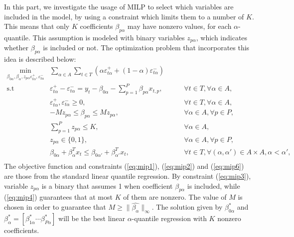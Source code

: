 In this part, we investigate the usage of MILP to select which variables are included in the model, by using a constraint which limits them to a number of $K$. This means that only $K$ coefficients $\beta_{p\alpha}$ may have nonzero values, for each $\alpha$-quantile. 
This assumption is modeled with binary variables $z_{p\alpha}$, which indicates whether $\beta_{p\alpha}$ is included or not.
The optimization problem that incorporates this idea is described below:
\begin{eqnarray}
 \underset{\beta_{0\alpha},\beta_\alpha,z_{p \alpha} \varepsilon_{t \alpha}^{+},\varepsilon_{t \alpha}^{-}}{\text{min}} & \sum_{\alpha \in A} \sum_{t\in T}\left(\alpha\varepsilon_{t \alpha}^{+}+(1-\alpha)\varepsilon_{t\alpha}^{-}\right) \label{eq:mip0} \\
\mbox{s.t } & \varepsilon_{t \alpha}^{+}-\varepsilon_{t \alpha}^{-}=y_{t}-\beta_{0 \alpha}-\sum_{p=1}^{P}\beta_{p \alpha}x_{t,p},& \qquad\forall t \in T ,\forall \alpha \in A, \label{eq:mip1}\\
& \varepsilon_{t \alpha}^{+},\varepsilon_{t \alpha}^{-}\geq0,&\qquad\forall t \in T ,\forall \alpha \in A, \label{eq:mip2}\\
& - M z_{p \alpha} \leq \beta_{p \alpha} \leq M z_{p \alpha},&\qquad \forall \alpha \in A, \forall p\in P, \label{eq:mip3}\\
& \sum_{p=1}^P z_{p \alpha} \leq K, & \qquad \forall \alpha \in A, \label{eq:mip4}\\
& z_{p \alpha} \in \{0,1\},&\qquad \forall \alpha \in A, \forall p\in P, \label{eq:mip5}\\
& \beta_{0\alpha} + \beta_{\alpha}^T x_{t} \leq \beta_{0\alpha'} + \beta_{\alpha'}^T x_{t}, & \qquad \forall t \in T, \forall (\alpha, \alpha') \in A \times A,  \alpha < \alpha',\nonumber\\ \label{eq:mip6}
\end{eqnarray}
The objective function and constraints (\ref{eq:mip1}), (\ref{eq:mip2}) and (\ref{eq:mip6}) are those from the standard linear quantile regression. 
By constraint (\ref{eq:mip3}), variable $z_{p \alpha}$ is a binary that assumes 1 when coefficient $\beta_{p \alpha}$ is included, while (\ref{eq:mip4}) guarantees that at most $K$ of them are nonzero.
The value of $M$ is chosen in order to guarantee that $M \geq \|\hat{\beta_\alpha}\|_{\infty}$. The solution given by $\beta_{0\alpha}^*$ and $\beta_\alpha^* = [ \beta_{1 \alpha}^* \cdots \beta_{P\alpha}^* ]$ will be the best linear $\alpha$-quantile regression with $K$ nonzero coefficients.  

